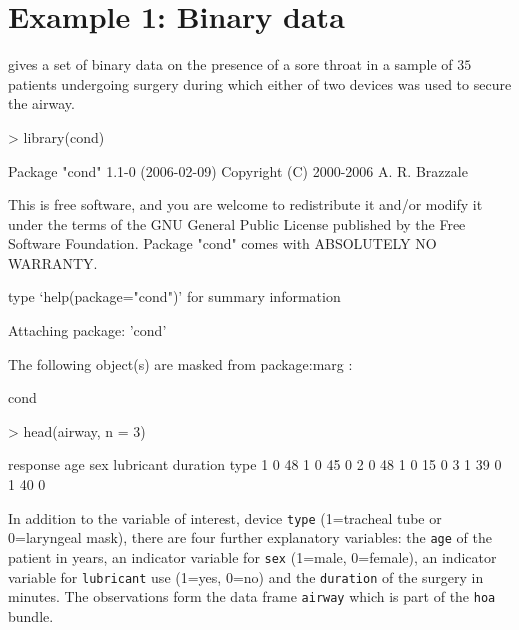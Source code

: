 \documentclass[a4paper,11pt]{article}
\def\code{\texttt}
\begin{document}
\section*{Example 1: Binary data}
%
\citet{collet:1998} gives a set of binary data on the presence of a sore throat in a sample of $35$ patients undergoing surgery during which either of two devices was used to secure the airway.  
%
\begin{Schunk}
\begin{Sinput}
> library(cond)
\end{Sinput}
\begin{Soutput}
   Package "cond" 1.1-0 (2006-02-09) 
   Copyright (C) 2000-2006 A. R. Brazzale

This is free software, and you are welcome to redistribute
it and/or modify it under the terms of the GNU General
Public License published by the Free Software Foundation.
Package "cond" comes with ABSOLUTELY NO WARRANTY.

type `help(package="cond")' for summary information

Attaching package: 'cond'


	The following object(s) are masked from package:marg :

	 cond 
\end{Soutput}
\begin{Sinput}
> head(airway, n = 3)
\end{Sinput}
\begin{Soutput}
  response age sex lubricant duration type
1        0  48   1         0       45    0
2        0  48   1         0       15    0
3        1  39   0         1       40    0
\end{Soutput}
\end{Schunk}
%
In addition to the variable of interest, device \code{type}  (1=tracheal tube or 0=laryngeal mask), there are four further explanatory variables: the \code{age} of the patient in years, an indicator variable for \code{sex} (1=male, 0=female), an indicator variable for \code{lubricant} use (1=yes, 0=no) and the \code{duration} of the surgery in minutes.  The observations form the data frame \code{airway} which is part of the \code{hoa} bundle. 
\end{document}

